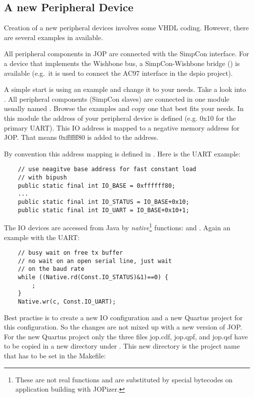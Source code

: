 \subsection{A new Peripheral Device}


Creation of a new peripheral devices involves some VHDL coding.
However, there are several examples in 
available.


All peripheral components in JOP are connected with the SimpCon
\cite{SimpCon} interface. For a device that implements the Wishbone
\cite{soc:wishbone} bus, a SimpCon-Wishbone bridge
() is available (e.g.\ it is used to connect the
AC97 interface in the dspio project).

A simple start is using an example and change it to your needs. Take
a look into . All peripheral components
(SimpCon slaves) are connected in one module usually named
. Browse the examples and copy one that best
fits your needs. In this module the address of your peripheral
device is defined (e.g. 0x10 for the primary UART). This IO address
is mapped to a negative memory address for JOP. That means
0xffffff80 is added to the address.

By convention this address mapping is defined in
. Here is the UART example:

\begin{verbatim}
    // use neagitve base address for fast constant load
    // with bipush
    public static final int IO_BASE = 0xffffff80;
    ...
    public static final int IO_STATUS = IO_BASE+0x10;
    public static final int IO_UART = IO_BASE+0x10+1;
\end{verbatim}

The IO devices are accessed from Java by
\emph{native}\footnote{These are not real functions and are
substituted by special bytecodes on application building with
JOPizer.} functions:  and
. Again an example with the UART:

\begin{verbatim}
    // busy wait on free tx buffer
    // no wait on an open serial line, just wait
    // on the baud rate
    while ((Native.rd(Const.IO_STATUS)&1)==0) {
        ;
    }
    Native.wr(c, Const.IO_UART);
\end{verbatim}

Best practise is to create a new IO configuration
 and a new Quartus project for this
configuration. So the changes are not mixed up with a new version of
JOP. For the new Quartus project only the three files jop.cdf,
jop.qpf, and jop.qsf have to be copied in a new directory under
. This new directory is the project name that has to
be set in the Makefile:

